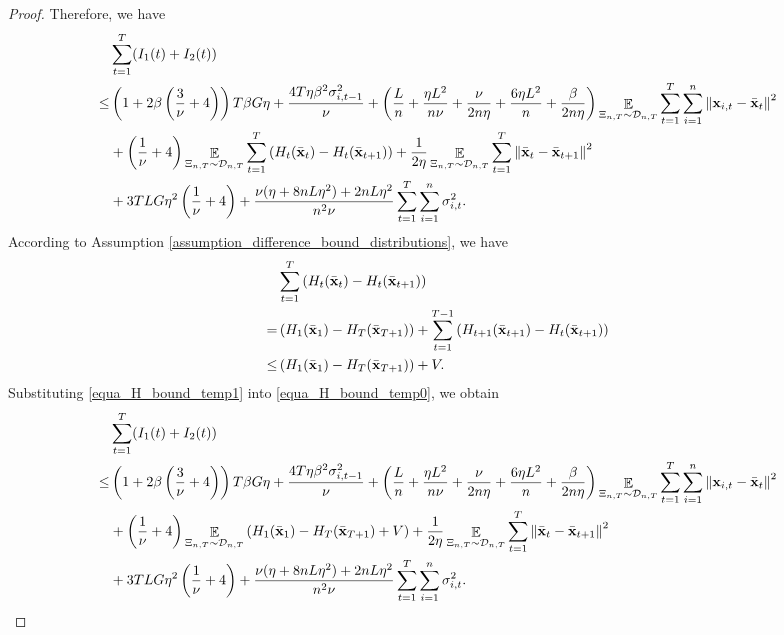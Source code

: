 \documentclass{article}
\begin{document}
\begin{proof}
Therefore, we have 
\begin{align}
\nonumber
&\sum_{t=1}^T (I_1(t) + I_2(t)) \\ \nonumber
\le & \left( 1 + 2\beta\left( \frac{3}{\nu}+4 \right) \right)T\beta G \eta + \frac{4T\eta \beta^2 \sigma_{i,t-1}^2}{\nu} + \left(  \frac{L}{n} + \frac{\eta L^2}{n\nu} + \frac{\nu}{2n\eta} + \frac{6\eta L^2}{n}  + \frac{\beta}{2n\eta}  \right)\mathop{\mathbb{E}}_{ \Xi_{n,T} \sim \mathcal{D}_{n,T} }\sum_{t=1}^T\sum_{i=1}^n\left\lVert{\bf x}_{i,t} - \bar{{\bf x}}_t \right\rVert^2 \\ \nonumber 
&+ \left( \frac{1}{\nu} + 4 \right)\mathop{\mathbb{E}}_{ \Xi_{n,T} \sim \mathcal{D}_{n,T} }\sum_{t=1}^T \left( H_t(\bar{{\bf x}}_t) - H_t(\bar{{\bf x}}_{t+1}) \right) + \frac{1}{2\eta}\mathop{\mathbb{E}}_{ \Xi_{n,T} \sim \mathcal{D}_{n,T} }\sum_{t=1}^T\left\lVert \bar{{\bf x}}_t - \bar{{\bf x}}_{t+1}\right\rVert^2 \\ \label{equa_H_bound_temp0} 
& + 3TLG\eta^2\left(  \frac{1}{\nu} + 4  \right) + \frac{\nu(\eta + 8nL\eta^2) + 2nL\eta^2}{n^2\nu} \sum_{t=1}^T\sum_{i=1}^n\sigma_{i,t}^2.
\end{align} According to Assumption \ref{assumption_difference_bound_distributions}, we have
\begin{align}
\nonumber
& \sum_{t=1}^T \left( H_t(\bar{{\bf x}}_t) - H_t(\bar{{\bf x}}_{t+1}) \right) \\ \nonumber
= & \left( H_1(\bar{{\bf x}}_1) - H_T(\bar{{\bf x}}_{T+1}) \right) + \sum_{t=1}^{T-1} \left( H_{t+1}(\bar{{\bf x}}_{t+1}) - H_t(\bar{{\bf x}}_{t+1}) \right) \\ \label{equa_H_bound_temp1}
\le & \left( H_1(\bar{{\bf x}}_1) - H_T(\bar{{\bf x}}_{T+1}) \right) + V.
\end{align} Substituting \eqref{equa_H_bound_temp1} into \eqref{equa_H_bound_temp0}, we obtain
\begin{align}
\nonumber
& \sum_{t=1}^T (I_1(t) + I_2(t)) \\ \nonumber
\le & \left( 1 + 2\beta\left( \frac{3}{\nu}+4 \right) \right)T\beta G \eta + \frac{4T\eta \beta^2 \sigma_{i,t-1}^2}{\nu} + \left(  \frac{L}{n} + \frac{\eta L^2}{n\nu} + \frac{\nu}{2n\eta} + \frac{6\eta L^2}{n}  + \frac{\beta}{2n\eta}  \right)\mathop{\mathbb{E}}_{ \Xi_{n,T} \sim \mathcal{D}_{n,T} }\sum_{t=1}^T\sum_{i=1}^n\left\lVert{\bf x}_{i,t} - \bar{{\bf x}}_t \right\rVert^2 \\ \nonumber 
&+ \left( \frac{1}{\nu} + 4 \right)\mathop{\mathbb{E}}_{ \Xi_{n,T} \sim \mathcal{D}_{n,T} } \left( H_1(\bar{{\bf x}}_1) - H_T(\bar{{\bf x}}_{T+1}) + V \right) + \frac{1}{2\eta}\mathop{\mathbb{E}}_{ \Xi_{n,T} \sim \mathcal{D}_{n,T} }\sum_{t=1}^T\left\lVert \bar{{\bf x}}_t - \bar{{\bf x}}_{t+1}\right\rVert^2 \\ \nonumber 
& + 3TLG\eta^2\left(  \frac{1}{\nu} + 4  \right) + \frac{\nu(\eta + 8nL\eta^2) + 2nL\eta^2}{n^2\nu} \sum_{t=1}^T\sum_{i=1}^n\sigma_{i,t}^2.
\end{align}





\end{proof}
\end{document}
